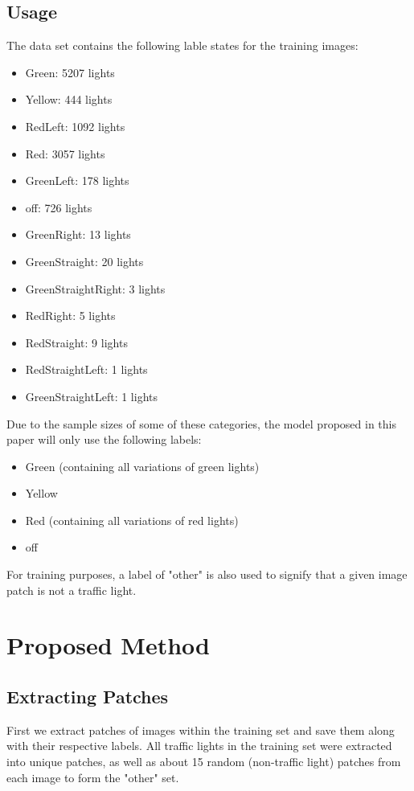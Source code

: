 \documentclass[a4paper]{article}
\begin{document}
\subsection{Usage}
The data set contains the following lable states for the training images:
\begin{itemize}
    \item Green: 5207 lights
    \item Yellow: 444 lights
    \item RedLeft: 1092 lights
    \item Red: 3057 lights
    \item GreenLeft: 178 lights
    \item off: 726 lights
    \item GreenRight: 13 lights
    \item GreenStraight: 20 lights
    \item GreenStraightRight: 3 lights
    \item RedRight: 5 lights
    \item RedStraight: 9 lights
    \item RedStraightLeft: 1 lights
    \item GreenStraightLeft: 1 lights
\end{itemize}
Due to the sample sizes of some of these categories, the model proposed in this paper will only use the following labels:
\begin{itemize}
    \item Green (containing all variations of green lights)
    \item Yellow
    \item Red (containing all variations of red lights)
    \item off
\end{itemize}
For training purposes, a label of "other" is also used to signify that a given image patch is not a traffic light.

\section{Proposed Method}
\subsection{Extracting Patches}
First we extract patches of images within the training set and save them along with their respective labels.  All traffic lights in the training set were extracted into unique patches, as well as about 15 random (non-traffic light) patches from each image to form the "other" set.
\end{document}
